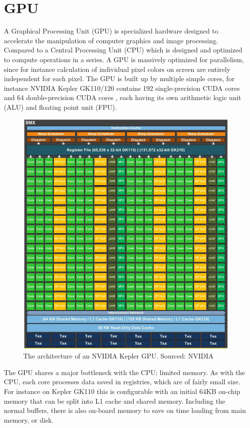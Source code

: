 \documentclass[../main.tex]{subfiles}
\begin{document}
\pagebreak\section{GPU}
A Graphical Processing Unit (GPU) is specialized hardware designed to accelerate the manipulation of computer graphics and image processing. Compared to a Central Processing Unit (CPU) which is designed and optimized to compute operations in a series. A GPU is massively optimized for parallelism, since for instance calculation of individual pixel colors on screen are entirely independent for each pixel.\cite{gpu_paper} The GPU is built up by multiple simple cores, for instance NVIDIA Kepler GK110/120 contains 192 single-precision CUDA cores and 64 double-precision CUDA cores \cite[p.9]{nvidia_kepler}, each having its own arithmetic logic unit (ALU) and floating point unit (FPU).
\begin{figure}[H]
    \centering
    \includegraphics[scale=.6]{img/SMXNvidia.PNG}
    \caption{The architecture of an NVIDIA Kepler GPU. Sourced: NVIDIA \cite{nvidia_kepler}}
    \label{fig:SMXNvidia}
\end{figure}
The GPU shares a major bottleneck with the CPU; limited memory. As with the CPU, each core processes data saved in registries, which are of fairly small size. For instance on Kepler GK110 this is configurable with an initial 64KB on-chip memory that can be split into L1 cache and shared memory.\cite[p13-14]{nvidia_kepler} Including the normal buffers, there is also on-board memory to save on time loading from main memory, or disk.
\end{document}
